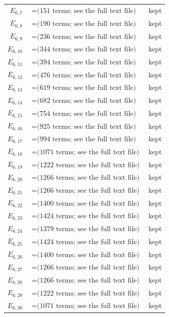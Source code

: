 \documentclass[10pt]{article}
\begin{document}
\begin{longtable}{r>{\raggedright\arraybackslash}p{}>{\raggedright\arraybackslash}p{}}
$E_{6,7}$ & $= \text{(151 terms; see the full text file)}$ & kept \\
$E_{6,8}$ & $= \text{(190 terms; see the full text file)}$ & kept \\
$E_{6,9}$ & $= \text{(236 terms; see the full text file)}$ & kept \\
$E_{6,10}$ & $= \text{(344 terms; see the full text file)}$ & kept \\
$E_{6,11}$ & $= \text{(394 terms; see the full text file)}$ & kept \\
$E_{6,12}$ & $= \text{(476 terms; see the full text file)}$ & kept \\
$E_{6,13}$ & $= \text{(619 terms; see the full text file)}$ & kept \\
$E_{6,14}$ & $= \text{(682 terms; see the full text file)}$ & kept \\
$E_{6,15}$ & $= \text{(754 terms; see the full text file)}$ & kept \\
$E_{6,16}$ & $= \text{(925 terms; see the full text file)}$ & kept \\
$E_{6,17}$ & $= \text{(994 terms; see the full text file)}$ & kept \\
$E_{6,18}$ & $= \text{(1071 terms; see the full text file)}$ & kept \\
$E_{6,19}$ & $= \text{(1222 terms; see the full text file)}$ & kept \\
$E_{6,20}$ & $= \text{(1266 terms; see the full text file)}$ & kept \\
$E_{6,21}$ & $= \text{(1266 terms; see the full text file)}$ & kept \\
$E_{6,22}$ & $= \text{(1400 terms; see the full text file)}$ & kept \\
$E_{6,23}$ & $= \text{(1424 terms; see the full text file)}$ & kept \\
$E_{6,24}$ & $= \text{(1379 terms; see the full text file)}$ & kept \\
$E_{6,25}$ & $= \text{(1424 terms; see the full text file)}$ & kept \\
$E_{6,26}$ & $= \text{(1400 terms; see the full text file)}$ & kept \\
$E_{6,27}$ & $= \text{(1266 terms; see the full text file)}$ & kept \\
$E_{6,28}$ & $= \text{(1266 terms; see the full text file)}$ & kept \\
$E_{6,29}$ & $= \text{(1222 terms; see the full text file)}$ & kept \\
$E_{6,30}$ & $= \text{(1071 terms; see the full text file)}$ & kept \\

\end{longtable}
\end{document}

